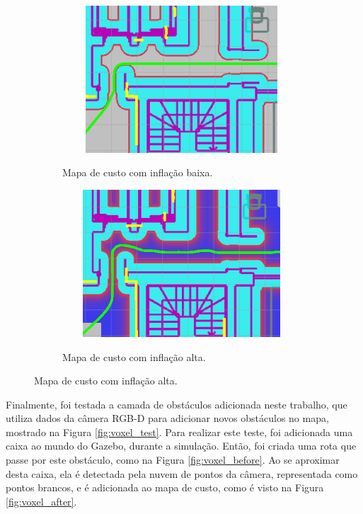 \documentclass[repeatfields,xlists,xpacks,oneside,yearsonly]{ufrgscca}
\begin{document}
\begin{figure}[h]
    \caption{Trajetórias criadas com diferentes configurações da camada de inflação}
    \begin{subfigure}{0.5\linewidth}
        {
            \centering
            \caption{Mapa de custo com inflação baixa.}
            \label{fig:inflation_low}
            \includegraphics[width=0.98\textwidth, height=5.5cm]{costmap_not_inflated.png}\\
        }
    \end{subfigure}
    \begin{subfigure}{0.5\linewidth}
        {
            \centering
            \caption{Mapa de custo com inflação alta.}
            \label{fig:inflation_high}
            \includegraphics[width=0.98\textwidth, height=5.5cm]{costmap_inflated.png}\\
        }
    \end{subfigure}
\end{figure}

Finalmente, foi testada a camada de obstáculos adicionada neste
trabalho, que utiliza dados da câmera RGB-D para adicionar novos
obstáculos no mapa, mostrado na Figura \ref{fig:voxel_test}. Para
realizar este teste, foi adicionada uma caixa ao mundo do Gazebo,
durante a simulação. Então, foi criada uma rota que passe por este
obstáculo, como na Figura \ref{fig:voxel_before}. Ao se aproximar
desta caixa, ela é detectada pela nuvem de pontos da câmera,
representada como pontos brancos, e é adicionada ao mapa de custo,
como é visto na Figura \ref{fig:voxel_after}.
\end{document}
